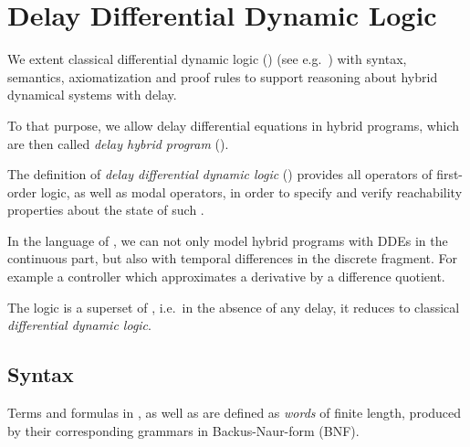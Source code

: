 \chapter{Delay Differential Dynamic Logic}
\label{ch:delay-differential-dynamic-logic}

We extent classical differential dynamic logic (\dL) (see e.g.~\cite{Platzer12LogicsDynSys}) with syntax, semantics, axiomatization and proof rules to support reasoning about hybrid dynamical systems with delay.

To that purpose, we allow delay differential equations in hybrid programs, which are then called \emph{delay hybrid program} (\dHP).

The definition of \emph{delay differential dynamic logic} (\ddL) provides all operators of first-order logic, as well as modal operators, in order to specify and verify reachability properties about the state of such \dHPs.

In the language of \ddL, we can not only model hybrid programs with DDEs in the continuous part, but also with temporal differences in the discrete fragment.
For example a controller which approximates a derivative by a difference quotient.

The logic \ddL is a superset of \dL, i.e.\ in the absence of any delay, it reduces to classical \emph{differential dynamic logic}.






\section{Syntax}
    \label{sec:syntax}

    Terms and formulas in \ddL, as well as \dHPs are defined as \emph{words} of finite length, produced by their corresponding grammars in Backus-Naur-form (BNF).

